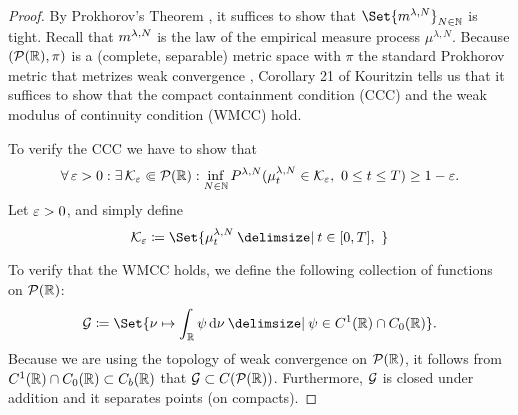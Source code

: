 \documentclass{article}
\begin{document}
\begin{proof}
  By Prokhorov's Theorem \cite[Theorem 5.1]{billingsleyConvergenceProbabilityMeasures1999}, it suffices to show that $\Set{ \lawmu^{\lambda, N} }_{N\in\bN}$ is tight.
  Recall that $m^{\lambda, N}$ is the law of the empirical measure process $\mu^{\lambda, N}$.
  Because $(\mathcal{P}(\mathbb{R}), \pi)$ is a (complete, separable) metric space with $\pi$ the standard Prokhorov metric that metrizes weak convergence \cite[Theorem 6.8]{billingsleyConvergenceProbabilityMeasures1999}, Corollary 21 of Kouritzin \cite{kouritzinTightnessProbabilityMeasures2015} tells us that it suffices to show that the compact containment condition (CCC) and the weak modulus of continuity condition (WMCC) hold.

  To verify the CCC we have to show that
  \begin{equation}
    \forall \eps > 0 : \exists \cK_\eps \Subset \cP(\potspace) :
    \inf_{N\in\bN} P^{\lambda, N} (\mu_t^{\lambda, N} \in \cK_\eps,\ 0 \leq t \leq T) \geq 1 - \eps.
  \end{equation}
  Let $\varepsilon > 0$, and simply define
  \begin{equation}
    \cK_\eps \coloneqq \Set{ \mu_t^{\lambda, N} \given t \in [0,T],\  }
  \end{equation}


  \bigskip

  To verify that the WMCC holds, we define the following collection of functions on $\mathcal{P}(\mathbb{R})$:
  \begin{equation}
    \cG \coloneqq \Set{\nu \mapsto \int_\potspace \psi \odif{\nu} \given \psi \in C^1(\potspace) \cap C_0(\potspace)}.
  \end{equation}
  Because we are using the topology of weak convergence on $\mathcal{P}(\mathbb{R})$, it follows from $C^1(\mathbb{R}) \cap C_0(\mathbb{R}) \subset C_b(\mathbb{R})$ that $\mathcal{G} \subset C(\mathcal{P}(\mathbb{R}))$.
  Furthermore, $\mathcal{G}$ is closed under addition and it separates points (on compacts).


\end{proof}
\end{document}
